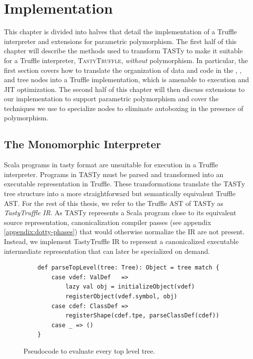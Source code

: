 \chapter{Implementation}
\label{chapter:implementation}

This chapter is divided into halves that detail the implementation of a Truffle interpreter and extensions for parametric polymorphism.
The first half of this chapter will describe the methods used to transform TASTy to make it suitable for a Truffle interpreter, \textsc{TastyTruffle}, \textit{without} polymorphism.
In particular, the first section covers how to translate the organization of data and code in the , , and  tree nodes into a Truffle implementation, which is amenable to execution and JIT optimization.
The second half of this chapter will then discuss extensions to our implementation to support parametric polymorphism and cover the techniques we use to specialize nodes to eliminate autoboxing in the presence of polymorphism. 

\section{The Monomorphic Interpreter}
\label{impl:section:monomorphic}

Scala programs in \acrshort{tasty} format are unsuitable for execution in a Truffle interpreter. 
Programs in TASTy must be parsed and transformed into an executable representation in Truffle.
These transformations translate the TASTy tree structure into a more straightforward but semantically equivalent Truffle AST.
For the rest of this thesis, we refer to the Truffle AST of TASTy as \textit{TastyTruffle IR}.
As TASTy represents a Scala program close to its equivalent source representation, canonicalization compiler passes (see appendix \ref{appendix:dotty-phases}) that would otherwise normalize the IR are not present. 
Instead, we implement TastyTruffle IR to represent a canonicalized executable intermediate representation that can later be specialized on demand. 

\begin{figure}[!htb]
	\begin{verbatim}
	def parseTopLevel(tree: Tree): Object = tree match {
		case vdef: ValDef   => 
			lazy val obj = initializeObject(vdef)
			registerObject(vdef.symbol, obj)			
		case cdef: ClassDef => 
			registerShape(cdef.tpe, parseClassDef(cdef))	
		case _ => ()
	}
	\end{verbatim}
	\caption{Pseudocode to evaluate every top level tree.}
	\label{impl:top-level}
\end{figure}

